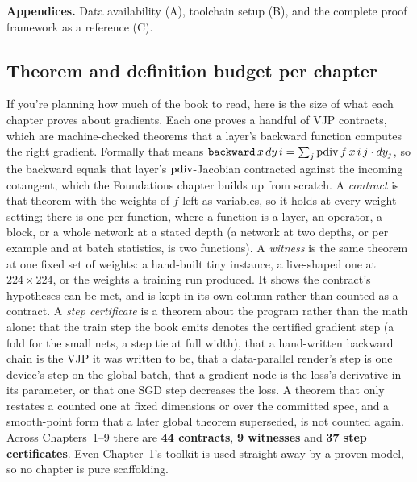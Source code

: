 \textbf{Appendices.} Data availability (A), toolchain setup (B), and
the complete proof framework as a reference (C).

\subsection*{Theorem and definition budget per chapter}

If you're planning how much of the book to read, here is the size of what
each chapter proves about gradients. Each one proves a handful of VJP
contracts, which are machine-checked theorems that a layer's backward
function computes the right gradient. Formally that means
\(\texttt{backward}\,x\,dy\,i = \sum_j \operatorname{pdiv} f\,x\,i\,j \cdot dy_j\), so
the backward equals that layer's \(\operatorname{pdiv}\)-Jacobian contracted against
the incoming cotangent, which the Foundations chapter builds up from
scratch. A \emph{contract} is that theorem with the weights of \(f\) left
as variables, so it holds at every weight setting; there is one per
function, where a function is a layer, an operator, a block, or a whole
network at a stated depth (a network at two depths, or per example and at
batch statistics, is two functions). A \emph{witness} is the same theorem
at one fixed set of weights: a hand-built tiny instance, a live-shaped one
at \(224 \times 224\), or the weights a training run produced. It shows
the contract's hypotheses can be met, and is kept in its own column rather
than counted as a contract. A \emph{step certificate} is a theorem about
the program rather than the math alone: that the train step the book emits
denotes the certified gradient step (a fold for the small nets, a step tie
at full width), that a hand-written backward chain is the VJP it was
written to be, that a data-parallel render's step is one device's step on
the global batch, that a gradient node is the loss's derivative in its
parameter, or that one SGD step decreases the loss. A theorem that
only restates a counted one at fixed dimensions or over the committed
spec, and a smooth-point form that a later global theorem superseded, is
not counted again. Across Chapters~1--9 there are \textbf{44 contracts},
\textbf{9 witnesses} and \textbf{37 step certificates}. Even Chapter~1's
toolkit is used straight away by a proven model, so no chapter is pure
scaffolding.


